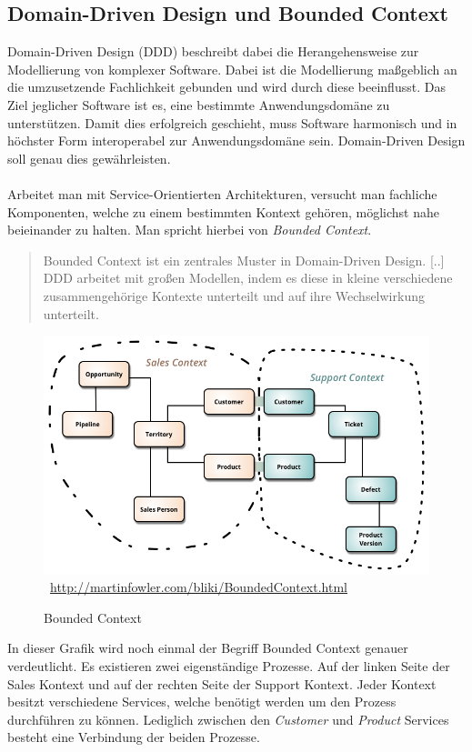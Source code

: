 \subsection{Domain-Driven Design und Bounded Context}
\label{sec:boundedContext}
Domain-Driven Design (DDD) beschreibt dabei die Herangehensweise zur Modellierung von komplexer Software. Dabei ist die Modellierung maßgeblich an die umzusetzende Fachlichkeit gebunden und wird durch diese beeinflusst. Das Ziel jeglicher Software ist es, eine bestimmte Anwendungsdomäne zu unterstützen. Damit dies erfolgreich geschieht, muss Software harmonisch und in höchster Form interoperabel zur Anwendungsdomäne sein. Domain-Driven Design soll genau dies gewährleisten.
\\\\
Arbeitet man mit Service-Orientierten Architekturen, versucht man fachliche Komponenten, welche zu einem bestimmten Kontext gehören, möglichst nahe beieinander zu halten. Man spricht hierbei von \textit{Bounded Context}. 
\begin{quotation}
    \frqq Bounded Context ist ein zentrales Muster in Domain-Driven Design. [..] DDD arbeitet mit großen Modellen, indem es diese in kleine verschiedene zusammengehörige Kontexte unterteilt und auf ihre Wechselwirkung unterteilt.\flqq\ \cite{mfowler:BoundedContext}
\end{quotation}

\begin{figure}[htb]
    \centering 
    \includegraphics[width=\linewidth]{content/images/BoundedContext}\
    \quelle\url{http://martinfowler.com/bliki/BoundedContext.html}
    \caption[Bounded Context]{Bounded Context\\}
    \label{fig:BoundedContext}  
\end{figure} 
In dieser Grafik wird noch einmal der Begriff Bounded Context genauer verdeutlicht. Es existieren zwei eigenständige Prozesse. Auf der linken Seite der Sales Kontext und auf der rechten Seite der Support Kontext. Jeder Kontext besitzt verschiedene Services, welche benötigt werden um den Prozess durchführen zu können. Lediglich zwischen den \textit{Customer} und \textit{Product} Services besteht eine Verbindung der beiden Prozesse.

